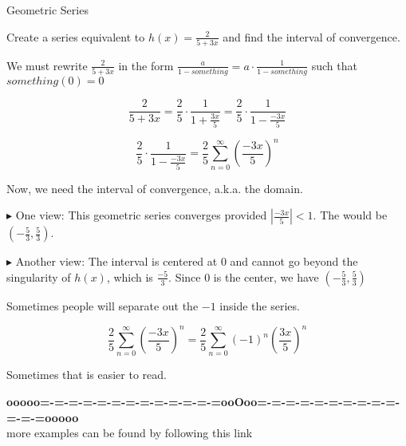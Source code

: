 \documentclass{ximera}
\begin{document}
\begin{example} Geometric Series



Create a series equivalent to $h(x) = \frac{2}{5 + 3x}$ and find the interval of convergence.



\begin{explanation}


We must rewrite $\frac{2}{5 + 3x}$ in the form $\frac{a}{1-something} = a \cdot \frac{1}{1-something}$ such that $something(0) = 0$




\[     \frac{2}{5 + 3x}  =   \frac{2}{5} \cdot \frac{1}{1 + \frac{3x}{5}}  =   \frac{2}{5} \cdot \frac{1}{1 - \frac{-3x}{5}}  \]



\[  \frac{2}{5} \cdot \frac{1}{1 - \frac{-3x}{5}}=  \frac{2}{5} \sum\limits_{n=0}^{\infty} \left(\frac{-3x}{5}\right)^n       \]





Now, we need the interval of convergence, a.k.a. the domain.  


$\blacktriangleright$ One view:  This geometric series converges provided   $\left| \frac{-3x}{5} \right| < 1$.  The would be $\left(-\frac{5}{3}, \frac{5}{3} \right)$.



$\blacktriangleright$ Another view: The interval is centered at $0$ and cannot go beyond the singularity of $h(x)$, which is $\frac{-5}{3}$.  Since $0$ is the center, we have $\left(-\frac{5}{3}, \frac{5}{3} \right)$


\end{explanation}


Sometimes people will separate out the $-1$ inside the series.

\[  \frac{2}{5} \sum\limits_{n=0}^{\infty} \left(\frac{-3x}{5}\right)^n    =   \frac{2}{5} \sum\limits_{n=0}^{\infty} (-1)^n \left(\frac{3x}{5}\right)^n   \]


Sometimes that is easier to read.


\end{example}






















\begin{center}
\textbf{\textcolor{green!50!black}{ooooo=-=-=-=-=-=-=-=-=-=-=-=-=ooOoo=-=-=-=-=-=-=-=-=-=-=-=-=ooooo}} \\

more examples can be found by following this link\\ 

\end{center}
\end{document}

